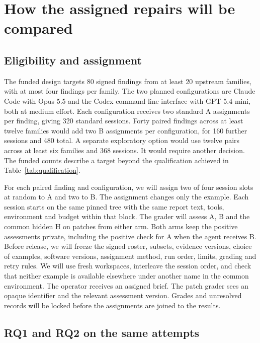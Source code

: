 \section{How the assigned repairs will be compared}

\label{sec:repair-study}

\subsection{Eligibility and assignment}

The funded design targets 80 signed findings from at least 20 upstream families, with at most four findings per family. The two planned configurations are Claude Code with Opus 5.5 and the Codex command-line interface with GPT-5.4-mini, both at medium effort. Each configuration receives two standard A assignments per finding, giving 320 standard sessions. Forty paired findings across at least twelve families would add two B assignments per configuration, for 160 further sessions and 480 total. A separate exploratory option would use twelve pairs across at least six families and 368 sessions. It would require another decision. The funded counts describe a target beyond the qualification achieved in Table~\ref{tab:qualification}.

For each paired finding and configuration, we will assign two of four session slots at random to A and two to B. The assignment changes only the example. Each session starts on the same pinned tree with the same report text, tools, environment and budget within that block. The grader will assess A, B and the common hidden H on patches from either arm. Both arms keep the positive assessments private, including the positive check for A when the agent receives B. Before release, we will freeze the signed roster, subsets, evidence versions, choice of examples, software versions, assignment method, run order, limits, grading and retry rules. We will use fresh workspaces, interleave the session order, and check that neither example is available elsewhere under another name in the common environment. The operator receives an assigned brief. The patch grader sees an opaque identifier and the relevant assessment version. Grades and unresolved records will be locked before the assignments are joined to the results.

\subsection{RQ1 and RQ2 on the same attempts}

